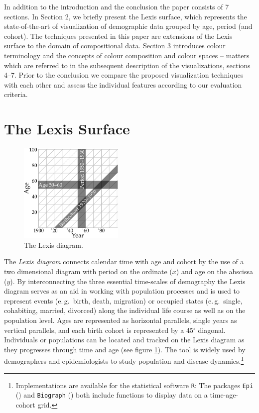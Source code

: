 \documentclass[a4paper]{scrartcl}
\begin{document}
In addition to the introduction and the conclusion the paper consists of 7 sections. In Section 2, we briefly present the Lexis surface, which represents the state-of-the-art of visualization of demographic data grouped by age, period (and cohort). The techniques presented in this paper are extensions of the Lexis surface to the domain of compositional data. Section 3 introduces colour terminology and the concepts of colour composition and colour spaces -- matters which are referred to in the subsequent description of the visualizations, sections 4--7. Prior to the conclusion we compare the proposed visualization techniques with each other and assess the individual features according to our evaluation criteria.

\section*{The Lexis Surface}

\begin{figure}
  \centering
  \includegraphics[width = 5cm]{../fig/plot-lexis_exmpl.pdf}
  \caption{The Lexis diagram.}
  \label{fig:lexis_exmpl}
\end{figure}

The \emph{Lexis diagram} connects calendar time with age and cohort by the use of a two dimensional diagram with period on the ordinate ($x$) and age on the abscissa ($y$). By interconnecting the three essential time-scales of demography the Lexis diagram serves as an aid in working with population processes and is used to represent events (e.\,g.~birth, death, migration) or occupied states (e.\,g.~single, cohabiting, married, divorced) along the individual life course as well as on the population level. Ages are represented as horizontal parallels, single years as vertical parallels, and each birth cohort is represented by a 45$^\circ$ diagonal. Individuals or populations can be located and tracked on the Lexis diagram as they progresses through time and age (see figure \ref{fig:lexis_exmpl}). The tool is widely used by demographers and epidemiologists to study population and disease dynamics.\footnote{Implementations are available for the statistical software \texttt{R}: The packages \texttt{Epi} (\cite{Carstensen2014}) and \texttt{Biograph} (\cite{Willekens2013b}) both include functions to display data on a time-age-cohort grid.}
\end{document}
